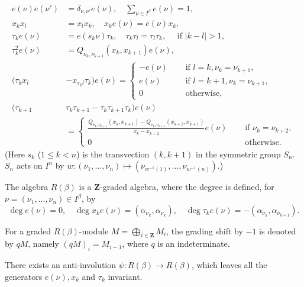 \documentclass[12pt]{amsart}
\renewcommand\a{\alpha}
\renewcommand\b{\beta}
\renewcommand\d{\delta}
\renewcommand\t{\tau}
\renewcommand{\1}{\mathbb 1}
\newcommand\BZ{\mathbf Z}
\newcommand\iv{^{-1}}
\numberwithin{equation}{section}
\begin{document}
\begin{align*}
\tag{1}
e(\nu)e(\nu') &= \d_{\nu,\nu'}e(\nu), \quad \sum_{\nu \in I^{\b}}e(\nu) = 1, \\
\tag{2}
x_kx_l &= x_lx_k, \quad  x_ke(\nu) = e(\nu)x_k, \\ 
\tag{3}
\tau_ke(\nu) &= e(s_k\nu)\tau_k, \quad 
           \tau_k\tau_l = \tau_l\tau_k, \quad\text{ if } |k - l| > 1, \\
\tag{4}
\tau_k^2e(\nu) &= Q_{\nu_k, \nu_{k+1}}(x_k, x_{k+1})e(\nu), \\
\tag{5}
(\tau_k x_l &- x_{s_k l}\tau_k)e(\nu) = 
                    \begin{cases}
                      -e(\nu)  &\quad\text{ if } l = k, \nu_k = \nu_{k+1}, \\
                       e(\nu)  &\quad\text{ if } l = k+1, \nu_k = \nu_{k+1}, \\
                       0       &\quad\text{ otherwise, }  
                    \end{cases}  \\
\tag{6}
(\tau_{k+1}&\tau_{k}\tau_{k+1} - \tau_{k}\tau_{k+1}\tau_{k})e(\nu)  \\
        &= \begin{cases}
     \displaystyle
     \frac{Q_{\nu_k,\nu_{k+1}}(x_k, x_{k+1}) - Q_{\nu_k,\nu_{k+1}}(x_{k+2}, x_{k+1})}
          {x_k - x_{k+2}}e(\nu)  &\quad\text{ if } \nu_k = \nu_{k+2}, \\
     0                           &\quad\text{ otherwise. }
          \end{cases}
\end{align*}  
(Here $s_k$ ($1 \le k < n$) is the transvection $(k, k+1)$ in the symmetric group
$S_n$. $S_n$ acts on $I^n$ by 
$w : (\nu_1, \dots, \nu_n) \mapsto (\nu_{w\iv(1)}, \dots, \nu_{w\iv (n)})$.)
\par
The algebra $R(\b)$ is a $\BZ$-graded algebra, where the degree is 
defined, for $\nu = (\nu_1, \dots, \nu_n) \in I^{\b}$, 
 by 
\begin{equation*}
\deg e(\nu) = 0, \quad \deg x_ke(\nu) = (\a_{\nu_k}, \a_{\nu_k}), \quad 
\deg\tau_ke(\nu) = -(\a_{\nu_k}, \a_{\nu_{k+1}}).
\end{equation*}  

For a graded $R(\b)$-module $M = \bigoplus_{i \in \BZ}M_i$, the grading shift
by $-1$ is denoted by $qM$, namely $(qM)_i = M_{i-1}$, where $q$ is an indeterminate.

There exists an anti-involution $\psi : R(\b) \to R(\b)$, which leaves all the
generators $e(\nu), x_k$ and $\t_k$ invariant. 
\end{document}
